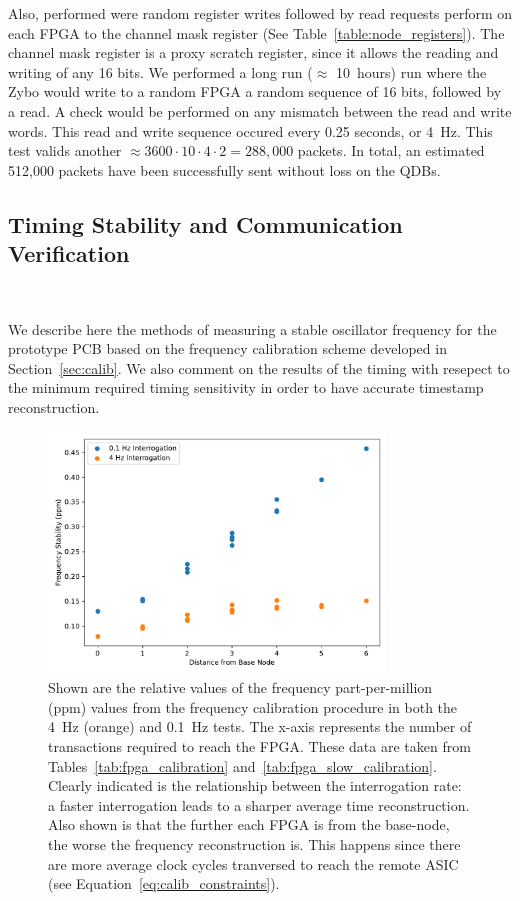 Also, performed were random register writes followed by read requests perform on each FPGA to the channel mask register (See Table~\ref{table:node_registers}).
The channel mask register is a proxy scratch register, since it allows the reading and writing of any 16 bits.
We performed a long run ($\approx$ 10~\unit{hours}) run where the Zybo would write to a random FPGA a random sequence of 16 bits, followed by a read.
A check would be performed on any mismatch between the read and write words.
This read and write sequence occured every 0.25 seconds, or 4~\unit{Hz}.
This test valids another $\approx 3600\cdot 10\cdot 4\cdot 2 = 288,000$ packets.
In total, an estimated 512,000 packets have been successfully sent without loss on the QDBs.

\subsection{Timing Stability and Communication Verification}~\label{sec:timing_test_results}

We describe here the methods of measuring a stable oscillator frequency for the prototype PCB based on the frequency calibration scheme developed in Section~\ref{sec:calib}.
We also comment on the results of the timing with resepect to the minimum required timing sensitivity in order to have accurate timestamp reconstruction.

\begin{figure}[]
\centering
\includegraphics[width=0.8\textwidth]{images/interrogation_ppm_diff.pdf}
\caption{Shown are the relative values of the frequency part-per-million (ppm) values from the frequency calibration procedure in both the 4~\unit{Hz} (orange) and 0.1~\unit{Hz} tests.
The x-axis represents the number of transactions required to reach the FPGA.
These data are taken from Tables~\ref{tab:fpga_calibration} and~\ref{tab:fpga_slow_calibration}.
Clearly indicated is the relationship between the interrogation rate: a faster interrogation leads to a sharper average time reconstruction.
Also shown is that the further each FPGA is from the base-node, the worse the frequency reconstruction is.
This happens since there are more average clock cycles tranversed to reach the remote ASIC (see Equation~\ref{eq:calib_constraints}).
}
\end{figure}


